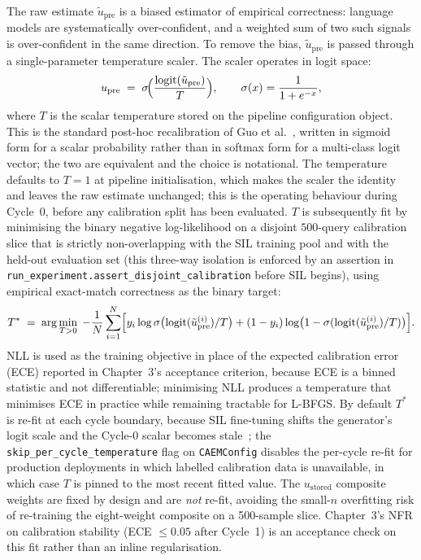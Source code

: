 The raw estimate $\tilde{u}_{\text{pre}}$ is a biased estimator of empirical correctness: language models are systematically over-confident, and a weighted sum of two such signals is over-confident in the same direction. To remove the bias, $\tilde{u}_{\text{pre}}$ is passed through a single-parameter temperature scaler. The scaler operates in logit space:
\begin{equation}
u_{\text{pre}} \;=\; \sigma\!\Bigl(\frac{\mathrm{logit}(\tilde{u}_{\text{pre}})}{T}\Bigr),
\qquad \sigma(x) = \frac{1}{1+e^{-x}},
\label{eq:temp-scale}
\end{equation}
where $T$ is the scalar temperature stored on the pipeline configuration object. This is the standard post-hoc recalibration of Guo et al.~\cite{pmlr-v70-guo17a}, written in sigmoid form for a scalar probability rather than in softmax form for a multi-class logit vector; the two are equivalent and the choice is notational. The temperature defaults to $T = 1$ at pipeline initialisation, which makes the scaler the identity and leaves the raw estimate unchanged; this is the operating behaviour during Cycle~0, before any calibration split has been evaluated. $T$ is subsequently fit by minimising the binary negative log-likelihood on a disjoint $500$-query calibration slice that is strictly non-overlapping with the SIL training pool and with the held-out evaluation set (this three-way isolation is enforced by an assertion in \texttt{run\_experiment.assert\_disjoint\_calibration} before SIL begins), using empirical exact-match correctness as the binary target:
\begin{equation}
T^{*} \;=\; \arg\min_{T > 0} \; -\frac{1}{N}\sum_{i=1}^{N}\Bigl[ y_{i} \log \sigma\bigl(\mathrm{logit}(\tilde{u}_{\text{pre}}^{(i)})/T\bigr) + (1 - y_{i}) \log\bigl(1 - \sigma(\mathrm{logit}(\tilde{u}_{\text{pre}}^{(i)})/T)\bigr)\Bigr].
\label{eq:temp-fit}
\end{equation}
NLL is used as the training objective in place of the expected calibration error (ECE) reported in Chapter~3's acceptance criterion, because ECE is a binned statistic and not differentiable; minimising NLL produces a temperature that minimises ECE in practice while remaining tractable for L-BFGS. By default $T^{*}$ is re-fit at each cycle boundary, because SIL fine-tuning shifts the generator's logit scale and the Cycle-0 scalar becomes stale~\citep{ovadia2019trust,thulasidasan2019mixup}; the \texttt{skip\_per\_cycle\_temperature} flag on \texttt{CAEMConfig} disables the per-cycle re-fit for production deployments in which labelled calibration data is unavailable, in which case $T$ is pinned to the most recent fitted value. The $u_{\text{stored}}$ composite weights are fixed by design and are \emph{not} re-fit, avoiding the small-$n$ overfitting risk of re-training the eight-weight composite on a 500-sample slice. Chapter~3's NFR on calibration stability (ECE $\leq 0.05$ after Cycle~1) is an acceptance check on this fit rather than an inline regularisation.

